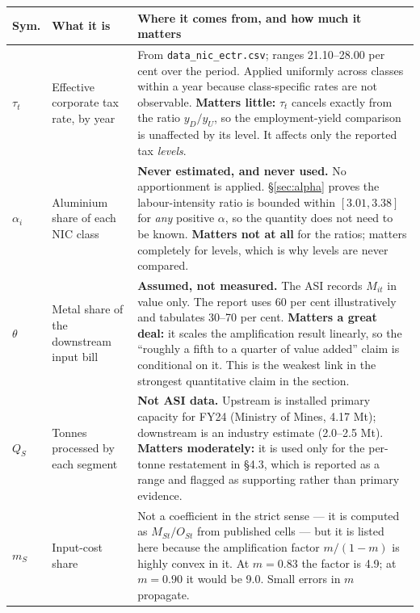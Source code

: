 \documentclass[11pt, a4paper]{article}
\begin{document}
\begin{table}[H]
\centering\small
\begin{tabular}{p{1.0cm}p{3.4cm}p{10.3cm}}
\toprule
\textbf{Sym.} & \textbf{What it is} & \textbf{Where it comes from, and how much it matters} \\
\midrule
$\tau_t$ & Effective corporate tax rate, by year & From
\texttt{data\_nic\_ectr.csv}; ranges 21.10--28.00 per cent over the period. Applied
uniformly across classes within a year because class-specific rates are not
observable. \textbf{Matters little:} $\tau_t$ cancels exactly from the ratio
$y_D/y_U$, so the employment-yield comparison is unaffected by its level. It affects
only the reported tax \emph{levels}. \\
\addlinespace
$\alpha_i$ & Aluminium share of each NIC class & \textbf{Never estimated, and never
used.} No apportionment is applied. §\ref{sec:alpha} proves the labour-intensity
ratio is bounded within $[3.01, 3.38]$ for \emph{any} positive $\alpha$, so the
quantity does not need to be known. \textbf{Matters not at all} for the ratios;
matters completely for levels, which is why levels are never compared. \\
\addlinespace
$\theta$ & Metal share of the downstream input bill & \textbf{Assumed, not measured.}
The ASI records $M_{it}$ in value only. The report uses 60 per cent illustratively
and tabulates 30--70 per cent. \textbf{Matters a great deal:} it scales the
amplification result linearly, so the ``roughly a fifth to a quarter of value added''
claim is conditional on it. This is the weakest link in the strongest quantitative
claim in the section. \\
\addlinespace
$Q_S$ & Tonnes processed by each segment & \textbf{Not ASI data.} Upstream is
installed primary capacity for FY24 (Ministry of Mines, 4.17 Mt); downstream is an
industry estimate (2.0--2.5 Mt). \textbf{Matters moderately:} it is used only for the
per-tonne restatement in §4.3, which is reported as a range and flagged as supporting
rather than primary evidence. \\
\addlinespace
$m_S$ & Input-cost share & Not a coefficient in the strict sense --- it is computed
as $M_{St}/O_{St}$ from published cells --- but it is listed here because the
amplification factor $m/(1-m)$ is highly convex in it. At $m = 0.83$ the factor is
4.9; at $m = 0.90$ it would be 9.0. Small errors in $m$ propagate. \\
\bottomrule
\end{tabular}
\end{table}
\end{document}

